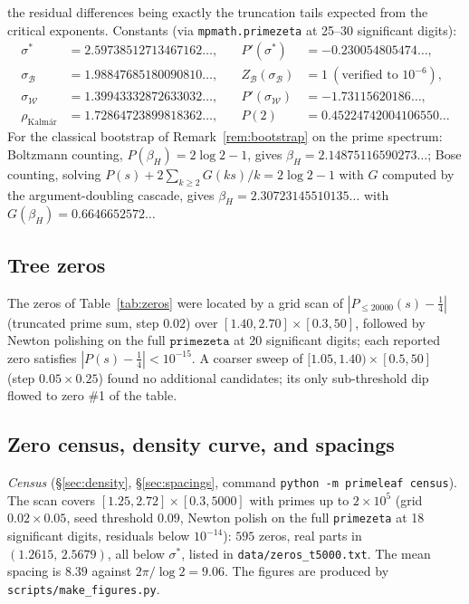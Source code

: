 \documentclass[11pt]{article}
\newcommand{\cW}{\mathcal{W}}   %
\newcommand{\cB}{\mathcal{B}}   %
\numberwithin{equation}{section}
\theoremstyle{plain}
\theoremstyle{definition}
\theoremstyle{remark}
\begin{document}
\noindent
the residual differences being exactly the truncation tails expected from the critical
exponents. Constants (via \texttt{mpmath.primezeta} at 25--30 significant digits):
\[
\begin{aligned}
\sigma^{*} &= 2.59738512713467162\dots, &\quad P'(\sigma^{*}) &= -0.230054805474\dots,\\
\sigma_\cB &= 1.98847685180090810\dots, &\quad Z_\cB(\sigma_\cB) &= 1\ (\text{verified to } 10^{-6}),\\
\sigma_\cW &= 1.39943332872633032\dots, &\quad P'(\sigma_\cW) &= -1.73115620186\dots,\\
\rho_{\text{Kalm\'ar}} &= 1.72864723899818362\dots, &\quad P(2) &= 0.45224742004106550\dots
\end{aligned}
\]
For the classical bootstrap of Remark~\ref{rem:bootstrap} on the prime spectrum:
Boltzmann counting, $P(\beta_H) = 2\log2 - 1$, gives
$\beta_H = 2.14875116590273\dots$; Bose counting, solving
$P(s) + 2\sum_{k\ge2} G(ks)/k = 2\log 2 - 1$ with $G$ computed by the
argument-doubling cascade, gives $\beta_H = 2.30723145510135\dots$ with
$G(\beta_H) = 0.6646652572\dots$

\subsection{Tree zeros}

The zeros of Table~\ref{tab:zeros} were located by a grid scan of
$|P_{\le 20000}(s) - \tfrac14|$ (truncated prime sum, step $0.02$) over
$[1.40, 2.70] \times [0.3, 50]$, followed by Newton polishing on the full
$\texttt{primezeta}$ at 20 significant digits; each reported zero satisfies
$|P(s) - \tfrac14| < 10^{-15}$. A coarser sweep of $[1.05, 1.40) \times [0.5, 50]$
(step $0.05 \times 0.25$) found no additional candidates; its only sub-threshold dip
flowed to zero \#1 of the table.

\subsection{Zero census, density curve, and spacings}

\emph{Census} (\S\ref{sec:density}, \S\ref{sec:spacings}, command
\texttt{python -m primeleaf census}). The scan covers
$[1.25, 2.72] \times [0.3, 5000]$ with primes up to $2 \times 10^5$ (grid
$0.02 \times 0.05$, seed threshold $0.09$, Newton polish on the full
\texttt{primezeta} at 18 significant digits, residuals below $10^{-14}$): $595$ zeros,
real parts in $(1.2615,\, 2.5679)$, all below $\sigma^{*}$, listed in
\texttt{data/zeros\_t5000.txt}. The mean spacing is $8.39$ against
$2\pi/\log 2 = 9.06$. The figures are produced by \texttt{scripts/make\_figures.py}.
\end{document}
